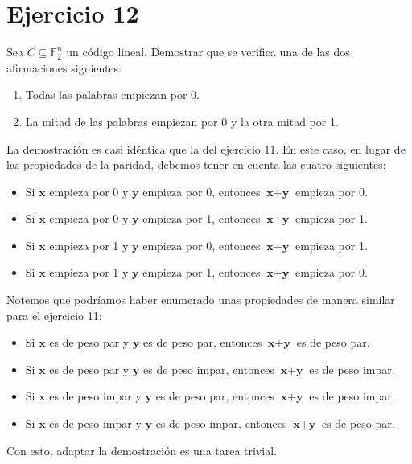 \section{Ejercicio 12}

\begin{formulationBox}
	Sea $C \subseteq \mathbb{F}_2^n$ un código lineal. Demostrar que se verifica una de las dos afirmaciones siguientes:
	\begin{enumerate}[label=\alph*)]
		\item Todas las palabras empiezan por 0.
		\item La mitad de las palabras empiezan por 0 y la otra mitad por 1.
	\end{enumerate}
\end{formulationBox}

La demostración es casi idéntica que la del ejercicio 11. En este caso, en lugar de las propiedades de la paridad, debemos tener en cuenta las cuatro siguientes:

\begin{itemize}
	\item Si $\textbf{x}$ empieza por 0 y $\textbf{y}$ empieza por 0, entonces $\textbf{x}+\textbf{y}$ empieza por 0.
	\item Si $\textbf{x}$ empieza por 0 y $\textbf{y}$ empieza por 1, entonces $\textbf{x}+\textbf{y}$ empieza por 1.
	\item Si $\textbf{x}$ empieza por 1 y $\textbf{y}$ empieza por 0, entonces $\textbf{x}+\textbf{y}$ empieza por 1.
	\item Si $\textbf{x}$ empieza por 1 y $\textbf{y}$ empieza por 1, entonces $\textbf{x}+\textbf{y}$ empieza por 0.
\end{itemize}

Notemos que podríamos haber enumerado unas propiedades de manera similar para el ejercicio 11:

\begin{itemize}
	\item Si $\textbf{x}$ es de peso par y $\textbf{y}$ es de peso par, entonces $\textbf{x}+\textbf{y}$ es de peso par.
	\item Si $\textbf{x}$ es de peso par y $\textbf{y}$ es de peso impar, entonces $\textbf{x}+\textbf{y}$ es de peso impar.
	\item Si $\textbf{x}$ es de peso impar y $\textbf{y}$ es de peso par, entonces $\textbf{x}+\textbf{y}$ es de peso impar.
	\item Si $\textbf{x}$ es de peso impar y $\textbf{y}$ es de peso impar, entonces $\textbf{x}+\textbf{y}$ es de peso par.
\end{itemize}

Con esto, adaptar la demostración es una tarea trivial.
